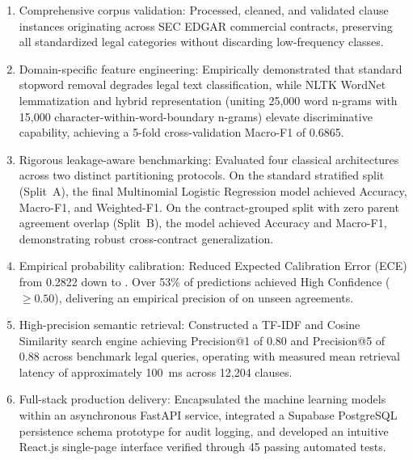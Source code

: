 \begin{enumerate}
    \item Comprehensive corpus validation: Processed, cleaned, and validated \TotalClauses{} clause instances originating across \TotalContracts{} SEC EDGAR commercial contracts, preserving all \NumClasses{} standardized legal categories without discarding low-frequency classes.
    \item Domain-specific feature engineering: Empirically demonstrated that standard stopword removal degrades legal text classification, while NLTK WordNet lemmatization and hybrid representation (uniting 25,000 word n-grams with 15,000 character-within-word-boundary n-grams) elevate discriminative capability, achieving a 5-fold cross-validation Macro-F1 of 0.6865.
    \item Rigorous leakage-aware benchmarking: Evaluated four classical architectures across two distinct partitioning protocols. On the standard stratified split (Split~A), the final Multinomial Logistic Regression model achieved \FinalSplitAAcc{} Accuracy, \FinalSplitAMacroFScore{} Macro-F1, and \FinalSplitAWeightedFScore{} Weighted-F1. On the contract-grouped split with zero parent agreement overlap (Split~B), the model achieved \FinalSplitBAcc{} Accuracy and \FinalSplitBMacroFScore{} Macro-F1, demonstrating robust cross-contract generalization.
    \item Empirical probability calibration: Reduced Expected Calibration Error (ECE) from 0.2822 down to \FinalSplitAECE{}. Over 53\% of predictions achieved High Confidence ($\ge 0.50$), delivering an empirical precision of \FinalSplitBHighConfPrec{} on unseen agreements.
    \item High-precision semantic retrieval: Constructed a TF-IDF and Cosine Similarity search engine achieving Precision@1 of 0.80 and Precision@5 of 0.88 across benchmark legal queries, operating with measured mean retrieval latency of approximately 100~ms across 12,204 clauses.
    \item Full-stack production delivery: Encapsulated the machine learning models within an asynchronous FastAPI service, integrated a Supabase PostgreSQL persistence schema prototype for audit logging, and developed an intuitive React.js single-page interface verified through 45 passing automated tests.
\end{enumerate}

